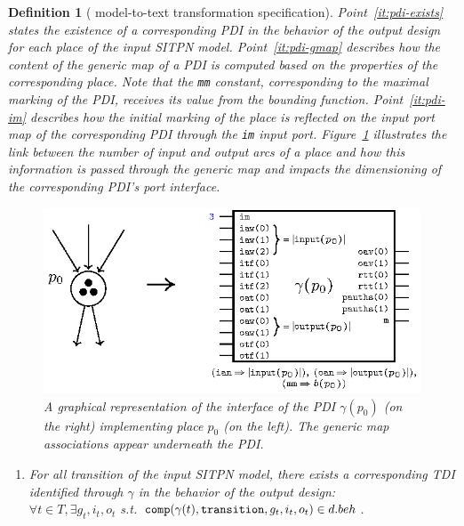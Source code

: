 \documentclass[pdflatex,sn-mathphys]{sn-jnl}%
\theoremstyle{thmstyleone}%
\theoremstyle{thmstyletwo}%
\theoremstyle{thmstylethree}%
\newtheorem{definition}{Definition}%
\begin{document}
\begin{definition}[\hilecop{} model-to-text transformation specification]
  \bigskip

  Point~\ref{it:pdi-exists} states the existence of a corresponding
  PDI in the behavior of the output design for each place of the input
  SITPN model. Point~\ref{it:pdi-gmap} describes how the content of
  the generic map of a PDI is computed based on the properties of the
  corresponding place. Note that the \texttt{mm} constant,
  corresponding to the maximal marking of the PDI, receives its value
  from the bounding function. Point~\ref{it:pdi-im} describes how the
  initial marking of the place is reflected on the input port map of
  the corresponding PDI through the \texttt{im} input
  port. Figure~\ref{fig:gen-pci-ex} illustrates the link between the
  number of input and output arcs of a place and how this information
  is passed through the generic map and impacts the dimensioning of
  the corresponding PDI's port interface.

  \begin{figure}[h]
    \centering
    \includegraphics[keepaspectratio,width=.7\textwidth]{gen-pci-ex.eps}
    \caption{A graphical representation of the interface of the PDI
      $\gamma(p_0)$ (on the right) implementing place $p_0$ (on the
      left). The generic map associations appear underneath the PDI.}
    \label{fig:gen-pci-ex}
  \end{figure}
  
  \begin{enumerate}[resume]

  \item\label{it:exists-tdi} For all transition of the input SITPN model, there exists a
    corresponding TDI identified through $\gamma$ in the behavior of
    the output design:\\
    $\forall{}t\in{}T,\exists{}g_t,i_t,o_t$ s.t. $\mathtt{comp}(\gamma(t),\mathtt{transition},g_t,i_t,o_t)\in{}d.beh$.
    

\end{enumerate}
\end{definition}
\end{document}
